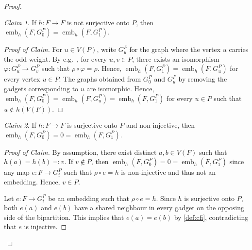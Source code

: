 \documentclass[10pt,a4paper]{article}
\theoremstyle{definition}
\theoremstyle{plain}
\theoremstyle{remark}
\newtheorem{claim}{Claim}[definition]
\newenvironment{claimproof}[1][Proof of Claim]{\begin{proof}[#1] \renewcommand{\qedsymbol}{$\lrcorner$}}{ \end{proof}}
\DeclareMathOperator{\emb}{emb}
\renewcommand{\phi}{\varphi}
\begin{document}
\begin{proof}
		\begin{claim}\label{cl:knn1}
			If $h \colon F\to F$ is not surjective onto $P$,
			then $\emb_h(F, G_0^P) = \emb_h(F, G_1^P)$.
		\end{claim}
		\begin{claimproof}
			For $u \in V(P)$, write $G_u^P$ for the  graph where the vertex $u$ carries the odd weight.
			By e.g.\ \cite[Lemma~11]{neuen_homomorphism-distinguishing_2024}, for every $u, v \in P$, there exists an isomorphism $\phi \colon G_u^P \to G_v^P$ such that $\rho \circ \phi = \rho$.
			Hence, $\emb_h(F, G_1^P) = \emb_h(F, G_u^P)$ for every vertex $u \in P$.
			The graphs obtained from $G_0^P$ and $G_u^P$ by removing the gadgets corresponding to $u$ are isomorphic.
			Hence,
			$\emb_h(F, G_0^P) = \emb_h(F, G_u^P) = \emb_h(F, G_1^P)$ for every $u \in P$ such that $u \not\in h(V(F))$.
		\end{claimproof}
		
		\begin{claim}\label{cl:knn2}
			If $h \colon F \to F$ is surjective onto $P$
			and non-injective,
			then $\emb_h(F, G^P_0) = 0 = \emb_h(F, G^P_1)$.
		\end{claim}
		\begin{claimproof}
			By assumption, there exist distinct $a, b \in V(F)$ such that $h(a) = h(b) \eqqcolon v$.
			If $v \not\in P$,
			then $\emb_h(F, G_0^P) = 0 = \emb_h(F, G_1^P)$ since any map $e \colon F \to G_i^P$ such that $\rho \circ e = h$ is non-injective and thus not an embedding.
			Hence, $v \in P$.

			Let $e \colon F \to G_i^P$ be an embedding such that $\rho \circ e = h$.
			Since $h$ is surjective onto $P$,
			both $e(a)$ and $e(b)$ have a shared neighbour in every  gadget on the opposing side of the bipartition.
			This implies that $e(a) = e(b)$ by \cref{def:cfi},
			contradicting that $e$ is injective. 
		\end{claimproof}
		

\end{proof}
\end{document}
